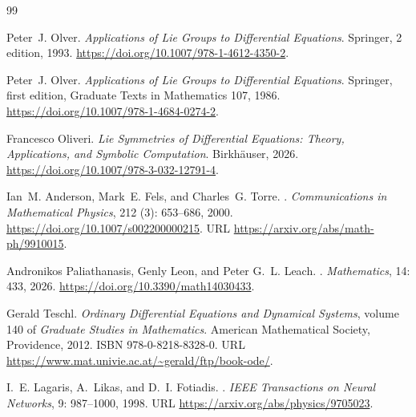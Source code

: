 \documentclass[11pt,a4paper,oneside]{report}
\numberwithin{equation}{chapter}
\begin{document}
\clearpage
{}
\begingroup\small\singlespacing
\setlength{\bibsep}{3pt plus 1pt minus 1pt}
\begin{thebibliography}{99}
\providecommand{\natexlab}[1]{#1}
\newcommand{\doi}[1]{\url{https://doi.org/#1}}

Peter~J. Olver.
\newblock \emph{{Applications of Lie Groups to Differential Equations}}.
\newblock Springer, 2 edition, 1993.
\newblock \doi{10.1007/978-1-4612-4350-2}.

Peter~J. Olver.
\newblock \emph{Applications of Lie Groups to Differential Equations}.
\newblock Springer, first edition, Graduate Texts in Mathematics 107, 1986.
\newblock \doi{10.1007/978-1-4684-0274-2}.


Francesco Oliveri.
\newblock \emph{{Lie Symmetries of Differential Equations: Theory,
  Applications, and Symbolic Computation}}.
\newblock Birkh{\"a}user, 2026.
\newblock \doi{10.1007/978-3-032-12791-4}.

Ian~M. Anderson, Mark~E. Fels, and Charles~G. Torre.
.
\newblock \emph{Communications in Mathematical Physics}, 212
  (3): 653--686, 2000.
\newblock \doi{10.1007/s002200000215}.
\newblock URL \url{https://arxiv.org/abs/math-ph/9910015}.

Andronikos Paliathanasis, Genly Leon, and Peter G.~L. Leach.
.
\newblock \emph{Mathematics}, 14: 433, 2026.
\newblock \doi{10.3390/math14030433}.

Gerald Teschl.
\newblock \emph{Ordinary Differential Equations and Dynamical Systems}, volume
  140 of \emph{Graduate Studies in Mathematics}.
\newblock American Mathematical Society, Providence, 2012.
\newblock ISBN 978-0-8218-8328-0.
\newblock URL \url{https://www.mat.univie.ac.at/~gerald/ftp/book-ode/}.

I.~E. Lagaris, A.~Likas, and D.~I. Fotiadis.
.
\newblock \emph{IEEE Transactions on Neural Networks}, 9: 987--1000,
  1998.
\newblock URL \url{https://arxiv.org/abs/physics/9705023}.


\end{thebibliography}
\end{document}
